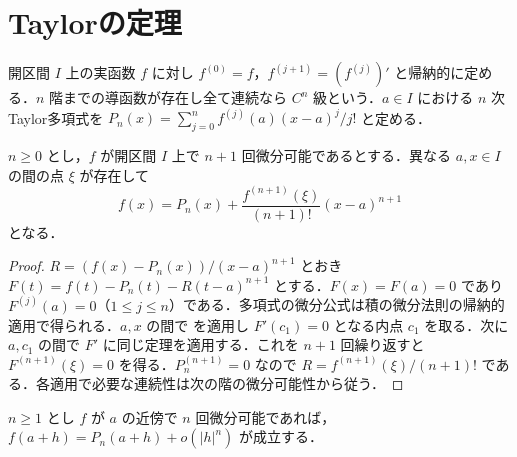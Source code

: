 \section{Taylorの定理}
\begin{defn}[高階導函数とTaylor多項式]
開区間 $I$ 上の実函数 $f$ に対し $f^{(0)}=f$，$f^{(j+1)}=(f^{(j)})'$ と帰納的に定める．$n$ 階までの導函数が存在し全て連続なら $C^n$ 級という．$a\in I$ における $n$ 次Taylor多項式を $P_n(x)=\sum_{j=0}^n f^{(j)}(a)(x-a)^j/j!$ と定める．
\end{defn}
\begin{prop}
$n\geq0$ とし，$f$ が開区間 $I$ 上で $n+1$ 回微分可能であるとする．異なる $a,x\in I$ の間の点 $\xi$ が存在して
\[
f(x)=P_n(x)+\frac{f^{(n+1)}(\xi)}{(n+1)!}(x-a)^{n+1}
\]
となる．
\end{prop}
\begin{proof}
$R=(f(x)-P_n(x))/(x-a)^{n+1}$ とおき $F(t)=f(t)-P_n(t)-R(t-a)^{n+1}$ とする．$F(x)=F(a)=0$ であり $F^{(j)}(a)=0$（$1\leq j\leq n$）である．多項式の微分公式は積の微分法則の帰納的適用で得られる．$a,x$ の間で  を適用し $F'(c_1)=0$ となる内点 $c_1$ を取る．次に $a,c_1$ の間で $F'$ に同じ定理を適用する．これを $n+1$ 回繰り返すと $F^{(n+1)}(\xi)=0$ を得る．$P_n^{(n+1)}=0$ なので $R=f^{(n+1)}(\xi)/(n+1)!$ である．各適用で必要な連続性は次の階の微分可能性から従う．
\end{proof}
\begin{prop}
$n\geq1$ とし $f$ が $a$ の近傍で $n$ 回微分可能であれば，$f(a+h)=P_n(a+h)+o(|h|^n)$ が成立する．
\end{prop}
